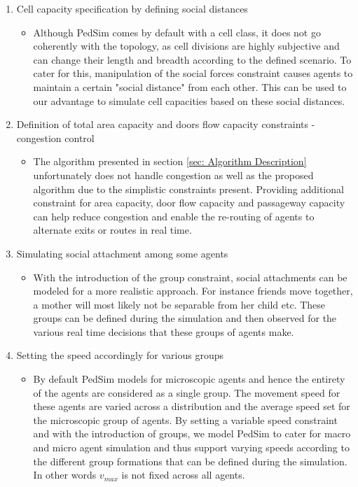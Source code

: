 \begin{enumerate}
  \item Cell capacity specification by defining social distances
  \begin{itemize}
  	\item Although PedSim comes by default with a cell class, it does not go coherently with the topology, as cell divisions are highly subjective and can change their length and breadth according to the defined scenario. To cater for this, manipulation of the social forces constraint causes agents to maintain a certain "social distance" from each other. This can be used to our advantage to simulate cell capacities based on these social distances.
  \end{itemize}
  \item Definition of total area capacity and doors flow capacity constraints -congestion control
  \begin{itemize}
  	\item The algorithm presented in section \ref{sec: Algorithm Description} unfortunately does not handle congestion as well as the proposed algorithm due to the simplistic constraints present. Providing additional constraint for area capacity, door flow capacity and passageway capacity can help reduce congestion and enable the re-routing of agents to alternate exits or routes in real time.
  \end{itemize}
  \item Simulating social attachment among some agents
  \begin{itemize}
  	\item With the introduction of the group constraint, social attachments can be modeled for a more realistic approach. For instance friends move together, a mother will most likely not be separable from her child etc. These groups can be defined during the simulation and then observed for the various real time decisions that these groups of agents make.
  \end{itemize}
  \item Setting the speed accordingly for various groups
  \begin{itemize}
  	\item By default PedSim models for microscopic agents and hence the entirety of the agents are considered as a single group. The movement speed for these agents are varied across a distribution and the average speed set for the microscopic group of agents. By setting a variable speed constraint and with the introduction of groups, we model PedSim to cater for macro and micro agent simulation and thus support varying speeds according to the different group formations that can be defined during the simulation. In other words $v_{max}$ is not fixed across all agents.
  \end{itemize}
\end{enumerate}

